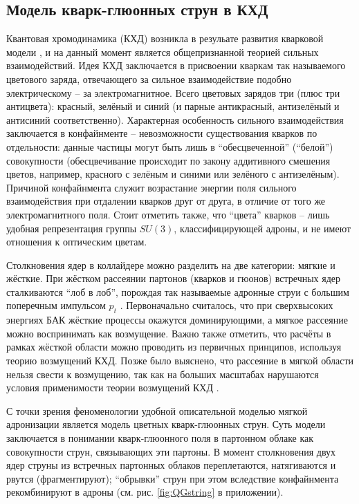 \subsection{Модель кварк-глюонных струн в КХД}
Квантовая хромодинамика (КХД) возникла в резульате развития кварковой модели \cite{YndurainQCD}, и на данный момент является общепризнанной теорией сильных взаимодействий. 
Идея КХД заключается в присвоении кваркам так называемого цветового заряда, отвечающего за сильное взаимодействие подобно электрическому -- за электромагнитное. 
Всего цветовых зарядов три (плюс три антицвета): красный, зелёный и синий (и парные антикрасный, антизелёный и антисиний соответственно). 
Характерная особенность сильного взаимодействия заключается в конфайнменте -- невозможности существования кварков по отдельности: данные частицы могут быть лишь в ``обесцвеченной'' (``белой'') совокупности (обесцвечивание происходит по закону аддитивного смешения цветов, например, красного с зелёным и синими или зелёного с антизелёным). 
Причиной конфайнмента служит возрастание энергии поля сильного взаимодействия при отдалении кварков друг от друга, в отличие от того же электромагнитного поля. 
Стоит отметить также, что ``цвета'' кварков -- лишь удобная репрезентация группы $SU(3)$, классифицирующей адроны, и не имеют отношения к оптическим цветам.

Столкновения ядер в коллайдере можно разделить на две категории: мягкие и жёсткие. 
При жёстком рассеянии партонов (кварков и гюонов) встречных ядер  сталкиваются ``лоб в лоб'', порождая так называемые адронные струи с большим поперечным импульсом $p_t$ \cite{HadronJet}. 
Первоначально считалось, что при сверхвысоких энергиях БАК
жёсткие процессы окажутся доминирующими, а мягкое рассеяние можно воспринимать как возмущение. 
Важно также отметить, что расчёты в рамках жёсткой области можно проводить из первичных принципов, используя теорию возмущений КХД. 
Позже было выяснено, что рассеяние в мягкой области нельзя свести к возмущению, так как на больших масштабах нарушаются условия применимости теории возмущений КХД \cite{SoftQCD1,SoftQCD2}.

С точки зрения феноменологии удобной описательной моделью мягкой адронизации является модель цветных кварк-глюонных струн\cite{ColorStringsModel1,ColorStringsModel2,ColorStringsModel3,ColorStringsModel4}. 
Суть модели заключается в понимании кварк-глюонного поля в партонном облаке как совокупности струн, связывающих эти партоны. 
В момент столкновения двух ядер струны из встречных партонных облаков переплетаются, натягиваются и рвутся (фрагментируют); ``обрывки'' струн при этом вследствие конфайнмента рекомбинируют в адроны (см. рис. \ref{fig:QGstring} в приложении). 

